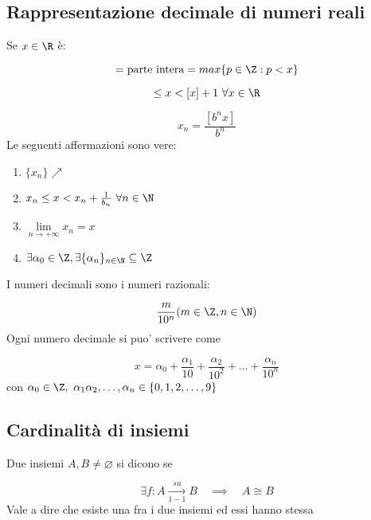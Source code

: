 \documentclass[../appunti.tex]{subfiles}
\begin{document}
\subsection{Rappresentazione decimale di numeri reali}
Se $ x \in \R $ è:

\begin{equation}
	[ x ] = \mbox{parte intera} = max\{ p \in \Z: p < x \} 
\end{equation}
\bda

\begin{equation}
	[ x ] \leq x < [ x ] + 1\ \forall x \in \R 
\end{equation}
\bda 

\begin{equation}
	x_n = \frac{[b^nx]}{b^n}
\end{equation}
Le seguenti affermazioni sono vere:

\begin{enumerate}
	\item $\{ x_n \} \nearrow $ 
	\item $x_n \leq x < x_n + \frac{1}{b_n}\ \forall n \in \N $
	\item $\lim \limits_{n \to + \infty} x_n = x $
	\item $\exists \alpha_0 \in \Z, \exists \{ \alpha_n \}_{n \in \N} \subseteq \Z $
\end{enumerate}


\begin{defn}[Decimali]
I numeri decimali sono i numeri razionali:

\begin{equation}
	\frac{m}{10^n} ( m \in \Z, n \in \N )
\end{equation}
Ogni numero decimale si puo' scrivere come 

\begin{equation}
	x = \alpha_0 + \frac{\alpha_1}{10} + \frac{\alpha_2}{10^2} + \dots + \frac{\alpha_n}{10^n}
\end{equation}
con $ \alpha_0 \in \Z,\ \alpha_1 \alpha_2, \dots, \alpha_n \in \{ 0,1,2,\dots,9 \}$

\end{defn}

\subsection{Cardinalità di insiemi}
Due insiemi $ A, B \neq \varnothing $ si dicono  se 

\begin{equation}
	\exists f: A \underset{1 - 1}{\overset{su}{\to}} B \quad
	\implies \quad A \cong B
\end{equation}
Vale a dire che esiste una  fra i due insiemi ed essi hanno stessa
\end{document}
